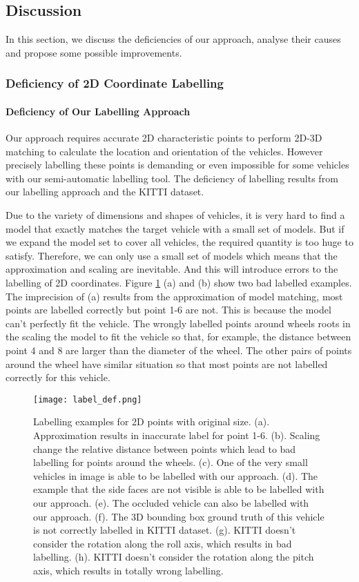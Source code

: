 \subsection{Discussion}
In this section, we discuss the deficiencies of our approach, analyse their causes and propose some possible improvements.

\subsubsection{Deficiency of 2D Coordinate Labelling}
\label{2d_def}
\paragraph{Deficiency of Our Labelling Approach}
Our approach requires accurate 2D characteristic points to perform 2D-3D matching to calculate the location and orientation of the vehicles. However precisely labelling these points is demanding or even impossible for some vehicles with our semi-automatic labelling tool. The deficiency of labelling results from our labelling approach and the KITTI dataset.

Due to the variety of dimensions and shapes of vehicles, it is very hard to find a model that exactly matches the target vehicle with a small set of models. But if we expand the model set to cover all vehicles, the required quantity is too huge to satisfy. Therefore, we can only use a small set of models which means that the approximation and scaling are inevitable. And this will introduce errors to the labelling of 2D coordinates. Figure \ref{figure:label_def} (a) and (b) show two bad labelled examples. The imprecision of (a) results from the approximation of model matching, \ie most points are labelled correctly but point 1-6 are not. This is because the model can't perfectly fit the vehicle. The wrongly labelled points around wheels roots in the scaling the model to fit the vehicle so that, for example, the distance between point 4 and 8 are larger than the diameter of the wheel. The other pairs of points around the wheel have similar situation so that most points are not labelled correctly for this vehicle.

\begin{figure}[H]		
	\texttt{[image: label\_def.png]}
	\caption{Labelling examples for 2D points with original size. (a). Approximation results in inaccurate label for point 1-6. (b). Scaling change the relative distance between points which lead to bad labelling for points around the wheels. (c). One of the very small vehicles in image is able to be labelled with our approach. (d). The example that the side faces are not visible is able to be labelled with our approach. (e). The occluded vehicle can also be labelled with our approach. (f). The 3D bounding box ground truth of this vehicle is not correctly labelled in KITTI dataset. (g). KITTI doesn't consider the rotation along the roll axis, which results in bad labelling. (h). KITTI doesn't consider the rotation along the pitch axis, which results in totally wrong labelling.}
	\centering
	\label{figure:label_def}
\end{figure}

